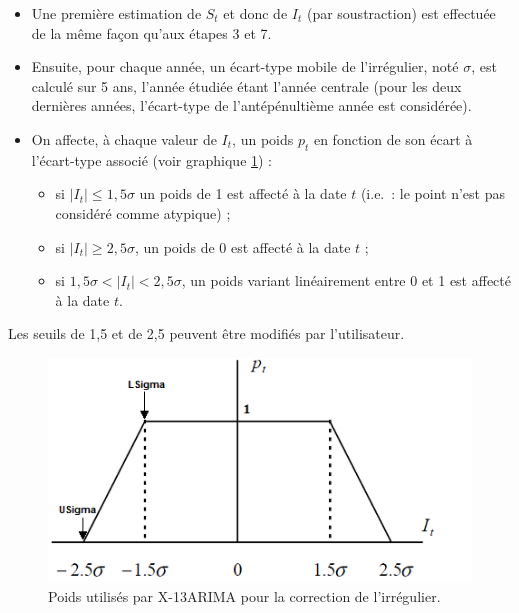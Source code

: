\documentclass[
  11pt,
  french,
  a4paper]{article}
\newcommand\1{\mathds{1}}
\begin{document}
\begin{itemize}
\item
  Une première estimation de \(S_t\) et donc de \(I_t\) (par soustraction) est effectuée de la même façon qu'aux étapes 3 et 7.
\item
  Ensuite, pour chaque année, un écart-type mobile de l'irrégulier, noté \(\sigma\), est calculé sur 5 ans, l'année étudiée étant l'année centrale (pour les deux dernières années, l'écart-type de l'antépénultième année est considérée).
\item
  On affecte, à chaque valeur de \(I_t\), un poids \(p_t\) en fonction de son écart à l'écart-type associé (voir graphique \ref{fig:correctionautox11}) :

  \begin{itemize}
  \item
    si \(\lvert I_t\rvert\leq 1,5 \sigma\) un poids de 1 est affecté à la date \(t\) (i.e.~: le point n'est pas considéré comme atypique) ;
  \item
    si \(\lvert I_t\rvert\geq 2,5 \sigma\), un poids de 0 est affecté à la date \(t\) ;
  \item
    si \(1,5 \sigma<\lvert I_t\rvert< 2,5 \sigma\), un poids variant linéairement entre 0 et 1 est affecté à la date \(t\).
  \end{itemize}
\end{itemize}

Les seuils de 1,5 et de 2,5 peuvent être modifiés par l'utilisateur.

\begin{figure}

{\centering \includegraphics[width=1\linewidth]{img/correction_auto_X11} 

}

\caption[Poids utilisés par X-13ARIMA pour la correction de l'irrégulier]{Poids utilisés par X-13ARIMA pour la correction de l'irrégulier.}\label{fig:correctionautox11}

\footnotesize
\normalsize\end{figure}
\end{document}
